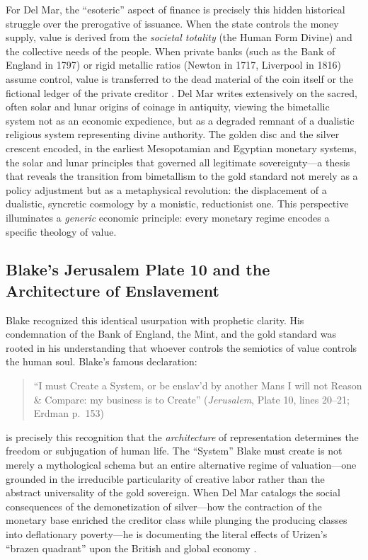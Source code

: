 \documentclass[
]{article}
\begin{document}
For Del Mar, the ``esoteric'' aspect of finance is precisely this hidden
historical struggle over the prerogative of issuance. When the state
controls the money supply, value is derived from the \emph{societal
totality} (the Human Form Divine) and the collective needs of the
people. When private banks (such as the Bank of England in 1797) or
rigid metallic ratios (Newton in 1717, Liverpool in 1816) assume
control, value is transferred to the dead material of the coin itself or
the fictional ledger of the private creditor \citep{clapham1944bank}.
Del Mar writes extensively on the sacred, often solar and lunar origins
of coinage in antiquity, viewing the bimetallic system not as an
economic expedience, but as a degraded remnant of a dualistic religious
system representing divine authority. The golden disc and the silver
crescent encoded, in the earliest Mesopotamian and Egyptian monetary
systems, the solar and lunar principles that governed all legitimate
sovereignty---a thesis that reveals the transition from bimetallism to
the gold standard not merely as a policy adjustment but as a
metaphysical revolution: the displacement of a dualistic, syncretic
cosmology by a monistic, reductionist one. This perspective illuminates
a \emph{generic} economic principle: every monetary regime encodes a
specific theology of value.

\subsection{Blake's Jerusalem Plate 10 and the Architecture of
Enslavement}\label{blakes-jerusalem-plate-10-and-the-architecture-of-enslavement}

Blake recognized this identical usurpation with prophetic clarity. His
condemnation of the Bank of England, the Mint, and the gold standard was
rooted in his understanding that whoever controls the semiotics of value
controls the human soul. Blake's famous declaration:

\begin{quote}
``I must Create a System, or be enslav'd by another Mans I will not
Reason \& Compare: my business is to Create'' (\emph{Jerusalem}, Plate
10, lines 20--21; Erdman p.~153) \citep{erdman1988complete}
\end{quote}

is precisely this recognition that the \emph{architecture} of
representation determines the freedom or subjugation of human life. The
``System'' Blake must create is not merely a mythological schema but an
entire alternative regime of valuation---one grounded in the irreducible
particularity of creative labor rather than the abstract universality of
the gold sovereign. When Del Mar catalogs the social consequences of the
demonetization of silver---how the contraction of the monetary base
enriched the creditor class while plunging the producing classes into
deflationary poverty---he is documenting the literal effects of Urizen's
``brazen quadrant'' upon the British and global economy
\citep{delmar1885history}.
\end{document}
